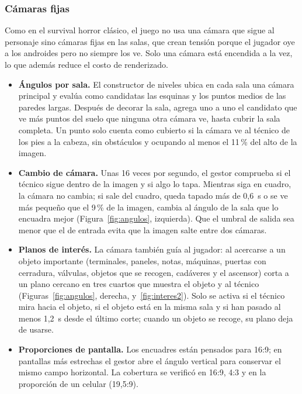 \subsubsection{Cámaras fijas}

Como en el survival horror clásico, el juego no usa una cámara que sigue al personaje sino cámaras
fijas en las salas, que crean tensión porque el jugador oye a los androides pero no siempre los ve.
Solo una cámara está encendida a la vez, lo que además reduce el costo de renderizado.

\begin{itemize}
  \item \textbf{Ángulos por sala.} El constructor de niveles ubica en cada sala una cámara
        principal y evalúa como candidatas las esquinas y los puntos medios de las paredes largas.
        Después de decorar la sala, agrega uno a uno el candidato que ve más puntos del suelo que
        ninguna otra cámara ve, hasta cubrir la sala completa. Un punto solo cuenta como cubierto si
        la cámara ve al técnico de los pies a la cabeza, sin obstáculos y ocupando al menos el 11\,\%
        del alto de la imagen.
  \item \textbf{Cambio de cámara.} Unas 16 veces por segundo, el gestor comprueba si el técnico
        sigue dentro de la imagen y si algo lo tapa. Mientras siga en cuadro, la cámara no cambia;
        si sale del cuadro, queda tapado más de 0,6~s o se ve más pequeño que el 9\,\% de la imagen,
        cambia al ángulo de la sala que lo encuadra mejor (Figura~\ref{fig:angulos}, izquierda). Que el umbral
        de salida sea menor que el de entrada evita que la imagen salte entre dos cámaras.
  \item \textbf{Planos de interés.} La cámara también guía al jugador: al acercarse a un objeto
        importante (terminales, paneles, notas, máquinas, puertas con cerradura, válvulas, objetos
        que se recogen, cadáveres y el ascensor) corta a un plano cercano en tres cuartos que
        muestra el objeto y al técnico (Figuras~\ref{fig:angulos}, derecha, y~\ref{fig:interes2}). Solo se activa si el técnico mira
        hacia el objeto, si el objeto está en la misma sala y si han pasado al menos 1,2~s desde el
        último corte; cuando un objeto se recoge, su plano deja de usarse.
  \item \textbf{Proporciones de pantalla.} Los encuadres están pensados para 16:9; en pantallas más
        estrechas el gestor abre el ángulo vertical para conservar el mismo campo horizontal. La
        cobertura se verificó en 16:9, 4:3 y en la proporción de un celular (19,5:9).
\end{itemize}

